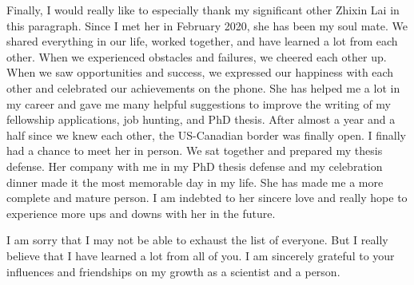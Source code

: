 Finally, I would really like to especially thank my significant other Zhixin Lai in this paragraph. Since I met her in February 2020, she has been my soul mate. We shared everything in our life, worked together, and have learned a lot from each other. When we experienced obstacles and failures, we cheered each other up. When we saw opportunities and success, we expressed our happiness with each other and celebrated our achievements on the phone. She has helped me a lot in my career and gave me many helpful suggestions to improve the writing of my fellowship applications, job hunting, and PhD thesis. After almost a year and a half since we knew each other, the US-Canadian border was finally open. I finally had a chance to meet her in person. We sat together and prepared my thesis defense. Her company with me in my PhD thesis defense and my celebration dinner made it the most memorable day in my life. She has made me a more complete and mature person. I am indebted to her sincere love and really hope to experience more ups and downs with her in the future.



















I am sorry that I may not be able to exhaust the list of everyone. But I really believe that I have learned a lot from all of you. I am sincerely grateful to your influences and friendships on my growth as a scientist and a person. 

